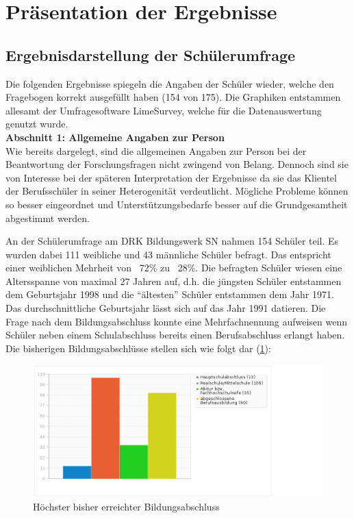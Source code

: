 \section{Präsentation der Ergebnisse}
\label{sec:PräsentationDerErgebnisse}

\subsection{Ergebnisdarstellung der Schülerumfrage}
\label{sec:ErgebnisdarstellungDerSchülerumfrage}

Die folgenden Ergebnisse spiegeln die Angaben der Schüler wieder, welche den Fragebogen korrekt ausgefüllt haben (154 von 175). Die Graphiken entstammen allesamt der Umfragesoftware LimeSurvey, welche für die Datenauswertung genutzt wurde.\\[0,5cm]

\textbf{Abschnitt 1: Allgemeine Angaben zur Person}\\
Wie bereits dargelegt, sind die allgemeinen Angaben zur Person bei der Beantwortung der Forschungsfragen nicht zwingend von Belang. Dennoch sind sie von Interesse bei der späteren Interpretation der Ergebnisse da sie das Klientel der Berufsschüler in seiner Heterogenität verdeutlicht. Mögliche Probleme können so besser eingeordnet und Unterstützungsbedarfe besser auf die Grundgesamtheit abgestimmt werden.

An der Schülerumfrage am DRK Bildungswerk SN nahmen 154 Schüler teil. Es wurden dabei 111 weibliche und 43 männliche
Schüler befragt. Das entspricht einer weiblichen Mehrheit von ~72\% zu ~28\%. Die befragten Schüler wiesen eine Altersspanne von maximal 27 Jahren auf, d.h. die jüngsten Schüler entstammen dem Geburtsjahr 1998 und die "`ältesten"' Schüler entstammen dem Jahr 1971. Das durchschnittliche Geburtsjahr lässt sich auf das Jahr 1991 datieren. Die Frage nach dem Bildungsabschluss konnte eine Mehrfachnennung aufweisen wenn Schüler neben einem Schulabschluss bereits einen Berufsabschluss erlangt haben. Die bisherigen Bildungsabschlüsse stellen sich wie folgt dar (\ref{fig:Hoechster-bisher-erreichter-Bildungsabschluss}):

\begin{figure}[hp]
	\centering
		\includegraphics[width=1.0\textwidth]{images/Hoechster-bisher-erreichter-Bildungsabschluss.png}
	\caption{Höchster bisher erreichter Bildungsabschluss}
	\label{fig:Hoechster-bisher-erreichter-Bildungsabschluss}
\end{figure}

